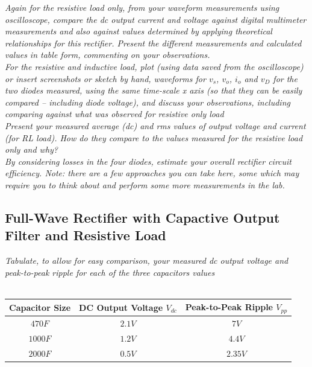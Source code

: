 \documentclass[12pt,a4paper]{article}
\begin{document}
\textit{Again for the resistive load only, from your waveform measurements using oscilloscope, compare
the dc output current and voltage against digital multimeter measurements and also against values
determined by applying theoretical relationships for this rectifier. Present the different measurements
and calculated values in table form, commenting on your observations.}\\

\textit{For the resistive and inductive load, plot (using data saved from the oscilloscope) or insert
screenshots or sketch by hand, waveforms for $v_s$, $v_o$, $i_o$ and $v_D$ for the two diodes measured, using
the same time-scale x axis (so that they can be easily compared – including diode voltage), and
discuss your observations, including comparing against what was observed for resistive only load}\\

\textit{Present your measured average (dc) and rms values of output voltage and current (for RL load).
How do they compare to the values measured for the resistive load only and why?}\\

\textit{By considering losses in the four diodes, estimate your overall rectifier circuit efficiency. Note: there
are a few approaches you can take here, some which may require you to think about and perform
some more measurements in the lab.}\\
\subsection{Full-Wave Rectifier with Capactive Output Filter and Resistive Load}
\textit{Tabulate, to allow for easy comparison, your measured dc output voltage and peak-to-peak ripple for each of the three capacitors values}\\\\

\begin{center}
	\begin{tabular}{|c|c|c|}
		\hline
		\centering\textbf{Capacitor Size} & \centering\textbf{DC Output Voltage $V_{dc}$} &\centering\textbf{Peak-to-Peak Ripple $V_{pp}$}\tabularnewline 
		\hline
		$470 F$ & $2.1V$ & $7V$ \\
		\hline
		$1000 F$ & $1.2V$ & $4.4V$\\
		\hline
		$2000 F$ & $0.5V$ & $2.35V$\\
		\hline
	\end{tabular}
\end{center}
\end{document}
